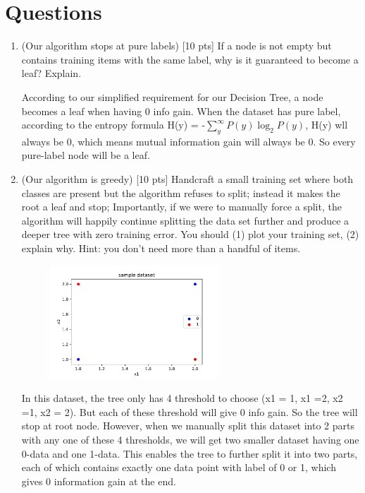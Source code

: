 \documentclass[a4paper]{article}
\theoremstyle{definition}
\newenvironment{soln}{
    \leavevmode\color{blue}\ignorespaces
}{}
\begin{document}
\section{Questions}
\begin{enumerate}
\item (Our algorithm stops at pure labels) [10 pts] If a node is not empty but contains training items with the same label, why is it guaranteed to become a leaf?  Explain.

\begin{soln} According to our simplified requirement for our Decision Tree, a node becomes a leaf when having 0 info gain. When the dataset has pure label, according to the entropy formula H(y) = -$\sum_{y}^{\infty} P(y){\log_2 P(y)}$, H(y) wll always be 0, which means mutual information gain will always be 0. So every pure-label node will be a leaf. \end{soln}

\item (Our algorithm is greedy)  [10 pts] Handcraft a small training set where both classes are present but the algorithm refuses to split; instead it makes the root a leaf and stop;
Importantly, if we were to manually force a split, the algorithm will happily continue splitting the data set further and produce a deeper tree with zero training error.
You should (1) plot your training set, (2) explain why.  Hint: you don't need more than a handful of items. 
\begin{soln} 
	    \begin{figure}[H]
	        \centering
	        \includegraphics[width=0.6\textwidth]{question2.pdf}
	        \captionsetup{labelformat=empty}
	        \caption{}
	        \label{fig:my_label}
	    \end{figure}
In this dataset, the tree only has 4 threshold to choose (x1 = 1, x1 =2, x2 =1, x2 = 2). But each of these threshold will give 0 info gain. So the tree will stop at root node. 
However, when we manually split this dataset into 2 parts with any one of these 4 thresholds, we will get two smaller dataset having one 0-data and one 1-data. This enables the tree to further split it into two parts, each of which contains exactly one data point with label of 0 or 1, which gives 0 information gain at the end.\end{soln}


\end{enumerate}
\end{document}
